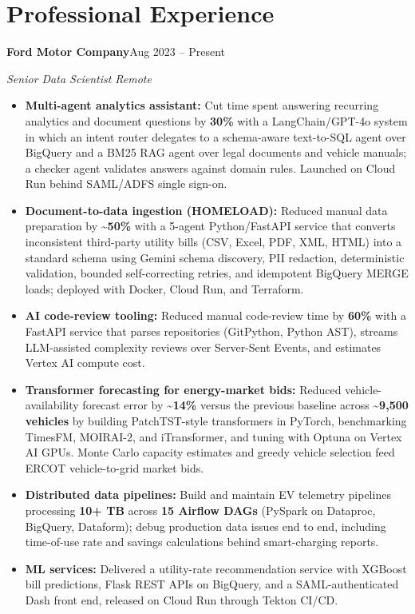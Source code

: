 \documentclass[letterpaper,10pt]{article}
\newcommand{\role}[3]{\par\addvspace{3pt}\needspace{5\baselineskip}\textbf{#1}\hfill #3\par{\itshape #2}\par}
\begin{document}
\section{Professional Experience}
\role{Ford Motor Company}{Senior Data Scientist \textbar{} Remote}{Aug 2023 -- Present}
\begin{itemize}
\item \textbf{Multi-agent analytics assistant:} Cut time spent answering recurring analytics and document questions by \textbf{30\%} with a LangChain/GPT-4o system in which an intent router delegates to a schema-aware text-to-SQL agent over BigQuery and a BM25 RAG agent over legal documents and vehicle manuals; a checker agent validates answers against domain rules. Launched on Cloud Run behind SAML/ADFS single sign-on.
\item \textbf{Document-to-data ingestion (HOMELOAD):} Reduced manual data preparation by \textbf{\textasciitilde 50\%} with a 5-agent Python/FastAPI service that converts inconsistent third-party utility bills (CSV, Excel, PDF, XML, HTML) into a standard schema using Gemini schema discovery, PII redaction, deterministic validation, bounded self-correcting retries, and idempotent BigQuery MERGE loads; deployed with Docker, Cloud Run, and Terraform.
\item \textbf{AI code-review tooling:} Reduced manual code-review time by \textbf{60\%} with a FastAPI service that parses repositories (GitPython, Python AST), streams LLM-assisted complexity reviews over Server-Sent Events, and estimates Vertex AI compute cost.
\item \textbf{Transformer forecasting for energy-market bids:} Reduced vehicle-availability forecast error by \textbf{\textasciitilde 14\%} versus the previous baseline across \textbf{\textasciitilde 9,500 vehicles} by building PatchTST-style transformers in PyTorch, benchmarking TimesFM, MOIRAI-2, and iTransformer, and tuning with Optuna on Vertex AI GPUs. Monte Carlo capacity estimates and greedy vehicle selection feed ERCOT vehicle-to-grid market bids.
\item \textbf{Distributed data pipelines:} Build and maintain EV telemetry pipelines processing \textbf{10+ TB} across \textbf{15 Airflow DAGs} (PySpark on Dataproc, BigQuery, Dataform); debug production data issues end to end, including time-of-use rate and savings calculations behind smart-charging reports.
\item \textbf{ML services:} Delivered a utility-rate recommendation service with XGBoost bill predictions, Flask REST APIs on BigQuery, and a SAML-authenticated Dash front end, released on Cloud Run through Tekton CI/CD.
\end{itemize}
\end{document}
